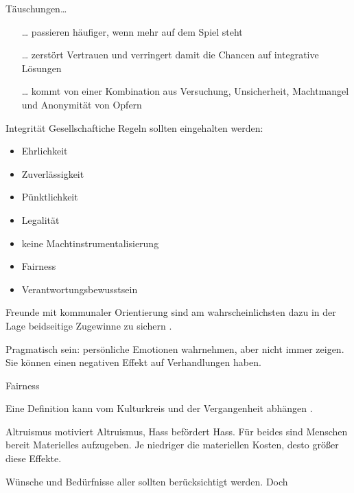 \begin{frame}{Täuschungen\ldots}

  \begin{itemize}
    \item[\ldots]passieren häufiger, wenn mehr auf dem Spiel steht \cites[][p. 292]{bazerman_negotiation_2000}[][p. 501]{thompson_negotiation_2010}
    \item[\ldots]zerstört Vertrauen und verringert damit die Chancen auf integrative Lösungen %
    \item[\ldots]kommt von einer Kombination aus Versuchung, Unsicherheit, Machtmangel und Anonymität von Opfern \cite[][p. 501]{thompson_negotiation_2010}
  \end{itemize}

\end{frame}

\begin{frame}{Integrität}
  Gesellschaftiche Regeln sollten eingehalten werden:

  \begin{itemize}
    \item Ehrlichkeit
    \item Zuverlässigkeit
    \item Pünktlichkeit
    \item Legalität
    \item keine Machtinstrumentalisierung
    \item Fairness
    \item Verantwortungsbewusstsein 
  \end{itemize}

  Freunde mit kommunaler Orientierung sind am wahrscheinlichsten dazu in der Lage beidseitige Zugewinne zu sichern \cite[][p. 502]{thompson_negotiation_2010}.
  
  Pragmatisch sein: persönliche Emotionen wahrnehmen, aber nicht immer zeigen. Sie können einen negativen Effekt auf Verhandlungen haben. \cite[][p. 13]{mccarthy_advanced_2015}
\end{frame}

\begin{frame}{Fairness}

  Eine Definition kann vom Kulturkreis und der Vergangenheit abhängen \cite{rabin_incorporating_1993}. 
  
  Altruismus motiviert Altruismus, Hass befördert Hass. Für beides sind Menschen bereit Materielles aufzugeben. Je niedriger die materiellen Kosten, desto größer diese Effekte. \cite{rabin_incorporating_1993}

  Wünsche und Bedürfnisse aller sollten berücksichtigt werden. Doch  

\end{frame}

